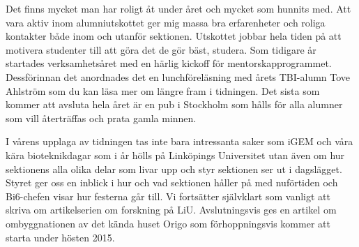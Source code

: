 Det finns mycket man har
roligt åt under året och mycket som hunnits med. Att vara aktiv inom
alumniutskottet ger mig massa bra erfarenheter och roliga kontakter
både inom och utanför sektionen. Utskottet jobbar hela tiden på att
motivera studenter till att göra det de gör bäst, studera. Som
tidigare år startades verksamhetsåret med en härlig kickoff för
mentorskapprogrammet. Dessförinnan det anordnades det en
lunchföreläsning med årets TBI-alumn Tove Ahlström som du kan läsa mer
om längre fram i tidningen. Det sista som kommer att avsluta hela året
är en pub i Stockholm som hålls för alla alumner som vill återträffas
och prata gamla minnen.

I vårens upplaga av tidningen tas inte bara intressanta saker som iGEM
och våra kära bioteknikdagar som i år hölls på Linköpings Universitet
utan även om hur sektionens alla olika delar som livar upp och styr
sektionen ser ut i dagslägget. Styret ger oss en inblick i hur och vad
sektionen håller på med nuförtiden och Bi6-chefen visar hur festerna
går till. Vi fortsätter självklart som vanligt att skriva om
artikelserien om forskning på LiU. Avslutningsvis ges en artikel om
ombyggnationen av det kända huset Origo som förhoppningsvis kommer att
starta under hösten 2015.


